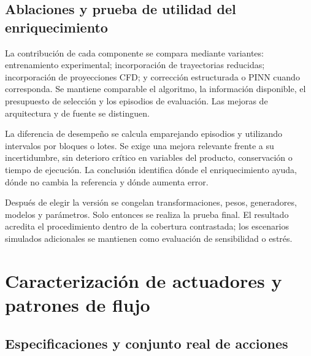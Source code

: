 \subsection{Ablaciones y prueba de utilidad del enriquecimiento}

La contribución de cada componente se compara mediante variantes: entrenamiento experimental; incorporación de trayectorias reducidas; incorporación de proyecciones CFD; y corrección estructurada o PINN cuando corresponda. Se mantiene comparable el algoritmo, la información disponible, el presupuesto de selección y los episodios de evaluación. Las mejoras de arquitectura y de fuente se distinguen.

La diferencia de desempeño se calcula emparejando episodios y utilizando intervalos por bloques o lotes. Se exige una mejora relevante frente a su incertidumbre, sin deterioro crítico en variables del producto, conservación o tiempo de ejecución. La conclusión identifica dónde el enriquecimiento ayuda, dónde no cambia la referencia y dónde aumenta error.

Después de elegir la versión se congelan transformaciones, pesos, generadores, modelos y parámetros. Solo entonces se realiza la prueba final. El resultado acredita el procedimiento dentro de la cobertura contrastada; los escenarios simulados adicionales se mantienen como evaluación de sensibilidad o estrés.

\section{Caracterización de actuadores y patrones de flujo}
\label{met:actuadores}

\subsection{Especificaciones y conjunto real de acciones}

